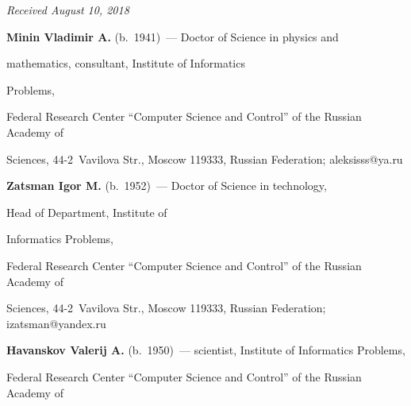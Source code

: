 







\vspace*{-3pt}





\hfill{\small\textit{Received August 10, 2018}}      


      


      \Contr


      


\noindent


\textbf{Minin Vladimir A.} (b.\ 1941)~--- Doctor of Science in physics and


mathematics, consultant, Institute of Informatics 


Problems,


Federal Research Center ``Computer Science and Control'' of the Russian Academy of


Sciences, 44-2~Vavilova Str., Moscow 119333, Russian Federation; \mbox{aleksisss@ya.ru} 





\vspace*{3pt}





\noindent


\textbf{Zatsman Igor M.} (b.\ 1952)~--- Doctor of Science in technology, 


Head of Department, Institute of 


Informatics Problems,


Federal Research Center ``Computer Science and Control'' of the Russian Academy of


Sciences, 44-2~Vavilova Str., Moscow 119333, Russian Federation; \mbox{izatsman@yandex.ru}





\vspace*{3pt}





\noindent


\textbf{Havanskov Valerij A.} (b.\ 1950)~--- scientist, Institute of Informatics Problems,


Federal Research Center ``Computer Science and Control'' of the Russian Academy of


